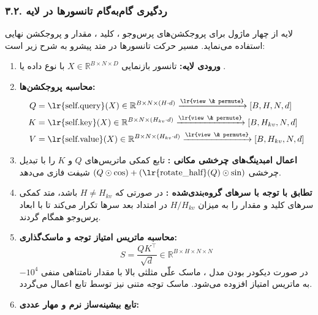 \subsubsection*{۳.۲. ردگیری گام‌به‌گام تانسورها در لایه }
لایه  از چهار ماژول  برای پروجکشن‌های پرس‌وجو ، کلید ، مقدار  و پروجکشن نهایی  استفاده می‌نماید. مسیر حرکت تانسورها در متد پیشرو به شرح زیر است:
\begin{enumerate}
    \item \textbf{ورودی لایه:} تانسور بازنمایی $X \in \mathbb{R}^{B \times N \times D}$ با نوع داده  یا .
    \item \textbf{محاسبه پروجکشن‌ها:}
    \begin{align}
    Q &= \text{\lr{self.query}}(X) \in \mathbb{R}^{B \times N \times (H \cdot d)} \xrightarrow{\text{\lr{view \& permute}}} [B, H, N, d] \\
    K &= \text{\lr{self.key}}(X) \in \mathbb{R}^{B \times N \times (H_{kv} \cdot d)} \xrightarrow{\text{\lr{view \& permute}}} [B, H_{kv}, N, d] \\
    V &= \text{\lr{self.value}}(X) \in \mathbb{R}^{B \times N \times (H_{kv} \cdot d)} \xrightarrow{\text{\lr{view \& permute}}} [B, H_{kv}, N, d]
    \end{align}
    \item \textbf{اعمال امبدینگ‌های چرخشی مکانی :} تابع کمکی  ماتریس‌های $Q$ و $K$ را با تبدیل چرخشی $\left(Q \odot \cos\right) + \left(\text{\lr{rotate\_half}}(Q) \odot \sin\right)$ شیفت فازی می‌دهد.
    \item \textbf{تطابق با توجه با سرهای گروه‌بندی‌شده :} در صورتی که $H \ne H_{kv}$ باشد، متد کمکی  سرهای کلید و مقدار را به میزان $H / H_{kv}$ در امتداد بعد سرها تکرار می‌کند تا با ابعاد پرس‌وجو همگام گردند.
    \item \textbf{محاسبه ماتریس امتیاز توجه و ماسک‌گذاری:}
    \begin{equation}
    S = \frac{Q K^\top}{\sqrt{d}} \in \mathbb{R}^{B \times H \times N \times N}
    \end{equation}
    در صورت دیکودر بودن مدل ، ماسک علّی مثلثی بالا با مقدار نامتناهی منفی $-10^4$ به ماتریس امتیاز افزوده می‌شود. ماسک توجه متنی  نیز توسط تابع  اعمال می‌گردد.
    \item \textbf{تابع بیشینه‌ساز نرم و مهار عددی:}
    \begin{equation}

\end{equation}
\end{enumerate}
